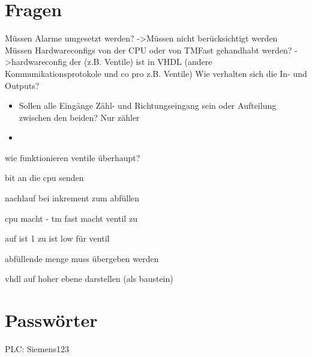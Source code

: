 \chapter{Fragen}
Müssen Alarme umgesetzt werden? ->Müssen nicht berücksichtigt werden
Müssen Hardwareconfigs von der CPU oder von TMFast gehandhabt werden? ->hardwareconfig der (z.B. Ventile) ist in VHDL (andere Kommunikationsprotokole und co pro z.B. Ventile)
Wie verhalten sich die In- und Outputs? 
\begin{itemize}
    \item Sollen alle Eingänge Zähl- und Richtungseingang sein oder Aufteilung zwischen den beiden? Nur zähler
    \item 
\end{itemize}

wie funktionieren ventile überhaupt?

bit an die cpu senden 

nachlauf bei inkrement zum abfüllen

cpu macht  - tm fast macht ventil zu

auf ist 1 zu ist low für ventil

abfüllende menge muss übergeben werden

vhdl auf hoher ebene darstellen (als baustein)

\chapter{Passwörter}

PLC: Siemens123